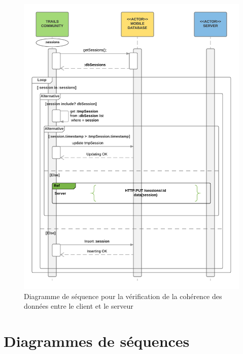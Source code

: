 \documentclass[titlepage, 12pt]{report}
\begin{document}
\begin{figure}[!h]
	\caption{Diagramme de séquence pour la vérification de la cohérence des données entre le client et le serveur}
	\label{check_consitency_data_client_serveur_sequence_diagram}
	\centering
	\includegraphics[scale=0.6]{Images/diagram/check_consistency_data_client_server_sequence_diagram.png}
\end{figure} 

\chapter{Diagrammes de séquences}
\end{document}
